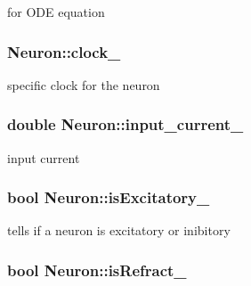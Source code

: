 for O\-D\-E equation 

\hypertarget{classNeuron_a87cd75cf2bbc61ad44535f96541db4ab}{
\subsubsection[{clock\-\_\-}]{ Neuron\-::clock\-\_\-\hspace{0.3cm}{\ttfamily [private]}}}\label{classNeuron_a87cd75cf2bbc61ad44535f96541db4ab}


specific clock for the neuron 

\hypertarget{classNeuron_af517fe863209cf8743ce417613004b44}{
\subsubsection[{input\-\_\-current\-\_\-}]{\setlength{\rightskip}{0pt plus 5cm}double Neuron\-::input\-\_\-current\-\_\-\hspace{0.3cm}{\ttfamily [private]}}}\label{classNeuron_af517fe863209cf8743ce417613004b44}


input current 

\hypertarget{classNeuron_af4443f35a3ffae3e97d68a72fb11c68d}{
\subsubsection[{is\-Excitatory\-\_\-}]{\setlength{\rightskip}{0pt plus 5cm}bool Neuron\-::is\-Excitatory\-\_\-\hspace{0.3cm}{\ttfamily [private]}}}\label{classNeuron_af4443f35a3ffae3e97d68a72fb11c68d}


tells if a neuron is excitatory or inibitory 

\hypertarget{classNeuron_a9c444314a4bcd7fe375dbc8243069e14}{
\subsubsection[{is\-Refract\-\_\-}]{\setlength{\rightskip}{0pt plus 5cm}bool Neuron\-::is\-Refract\-\_\-\hspace{0.3cm}{\ttfamily [private]}}}\label{classNeuron_a9c444314a4bcd7fe375dbc8243069e14}


